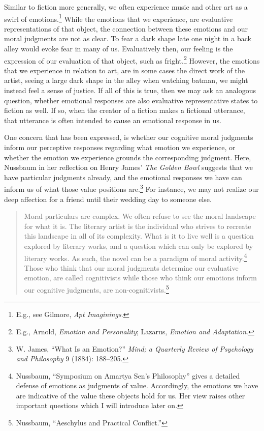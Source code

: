 \documentclass[phdthesis,12pt,final,a4paper]{wuthesis}
\theoremstyle{definition}
\theoremstyle{definition}
\theoremstyle{definition}
\theoremstyle{definition}
\theoremstyle{remark}
\begin{document}
Similar to fiction more generally, we often experience music and other art as a swirl of emotions.\footnote{E.g., see Gilmore, \emph{Apt {Imaginings}}.} While the emotions that we experience, are evaluative representations of that object, the connection between these emotions and our moral judgments are not as clear. To fear a dark shape late one night in a back alley would evoke fear in many of us. Evaluatively then, our feeling is the expression of our evaluation of that object, such as fright.\footnote{E.g., Arnold, \emph{Emotion and {Personality}}; Lazarus, \emph{Emotion and Adaptation}.} However, the emotions that we experience in relation to art, are in some cases the direct work of the artist, seeing a large dark shape in the alley when watching batman, we might instead feel a sense of justice. If all of this is true, then we may ask an analogous question, whether emotional responses are also evaluative representative states to fiction as well. If so, when the creator of a fiction makes a fictional utterance, that utterance is often intended to cause an emotional response in us.

One concern that has been expressed, is whether our cognitive moral judgments inform our perceptive responses regarding what emotion we experience, or whether the emotion we experience grounds the corresponding judgment. Here, Nussbaum in her reflection on Henry James' \emph{The Golden Bowl} suggests that we have particular judgments already, and the emotional responses we have can inform us of what those value positions are.\footnote{W. James, {``What Is an Emotion?''} \emph{Mind; a Quarterly Review of Psychology and Philosophy} 9 (1884): 188--205.} For instance, we may not realize our deep affection for a friend until their wedding day to someone else.

\begin{quote}
Moral particulars are complex. We often refuse to see the moral landscape for what it is. The literary artist is the individual who strives to recreate this landscape in all of its complexity. What is it to live well is a question explored by literary works, and a question which can only be explored by literary works. As such, the novel can be a paradigm of moral activity.\footnote{Nussbaum, {``Symposium on {Amartya Sen}'s Philosophy''} gives a detailed defense of emotions as judgments of value. Accordingly, the emotions we have are indicative of the value these objects hold for us. Her view raises other important questions which I will introduce later on.} Those who think that our moral judgments determine our evaluative emotion, are called cognitivists while those who think our emotions inform our cognitive judgments, are non-cognitivists.\footnote{Nussbaum, {``Aeschylus and Practical Conflict.''}}
\end{quote}
\end{document}
